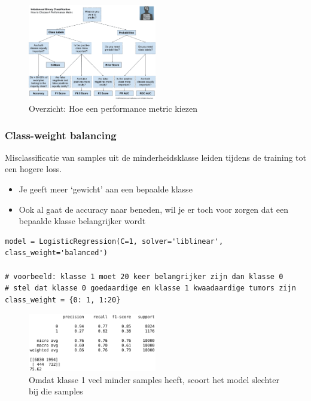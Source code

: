 \documentclass{article}
\begin{document}
\begin{figure}[H]
    \centering
    \includegraphics[width=0.5\textwidth]{how-to-choose-performance-metric.png}
    \caption{Overzicht: Hoe een performance metric kiezen}
\end{figure}


\subsubsection{Class-weight balancing}

Misclassificatie van samples uit de minderheidsklasse leiden tijdens de training tot een hogere loss.

\begin{itemize}
    \item Je geeft meer `gewicht' aan een bepaalde klasse
    \item Ook al gaat de accuracy naar beneden, wil je er toch voor zorgen dat een bepaalde klasse belangrijker wordt
\end{itemize}

\begin{verbatim}
model = LogisticRegression(C=1, solver='liblinear', class_weight='balanced')

# voorbeeld: klasse 1 moet 20 keer belangrijker zijn dan klasse 0
# stel dat klasse 0 goedaardige en klasse 1 kwaadaardige tumors zijn
class_weight = {0: 1, 1:20}
\end{verbatim}

\begin{figure}[H]
    \centering
    \includegraphics[width=0.5\textwidth]{class-weight-balancing.png}
    \caption{Omdat klasse 1 veel minder samples heeft, scoort het model slechter bij die samples}
\end{figure}
\end{document}
